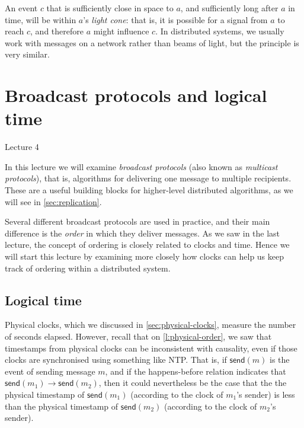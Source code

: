 An event $c$ that is sufficiently close in space to $a$, and sufficiently long after $a$ in time, will be within $a$'s \emph{light cone}: that is, it is possible for a signal from $a$ to reach $c$, and therefore $a$ might influence $c$.
In distributed systems, we usually work with messages on a network rather than beams of light, but the principle is very similar.



\section{Broadcast protocols and logical time}\label{sec:broadcast}

\begin{frame}
    \begin{center}
        Lecture 4\\[2em]
        \Large{\color{darkblue}{Broadcast protocols and logical time}}
    \end{center}
\end{frame}

In this lecture we will examine \emph{broadcast protocols} (also known as \emph{multicast protocols}), that is, algorithms for delivering one message to multiple recipients.
These are a useful building blocks for higher-level distributed algorithms, as we will see in \autoref{sec:replication}.

Several different broadcast protocols are used in practice, and their main difference is the \emph{order} in which they deliver messages.
As we saw in the last lecture, the concept of ordering is closely related to clocks and time.
Hence we will start this lecture by examining more closely how clocks can help us keep track of ordering within a distributed system.

\subsection{Logical time}\label{sec:logical-time}


Physical clocks, which we discussed in \autoref{sec:physical-clocks}, measure the number of seconds elapsed.
However, recall that on \autoref{l:physical-order}, we saw that timestamps from physical clocks can be inconsistent with causality, even if those clocks are synchronised using something like NTP.
That is, if $\mathsf{send}(m)$ is the event of sending message $m$, and if the happens-before relation indicates that $\mathsf{send}(m_1) \rightarrow \mathsf{send}(m_2)$, then it could nevertheless be the case that the the physical timestamp of $\mathsf{send}(m_1)$ (according to the clock of $m_1$'s sender) is less than the physical timestamp of $\mathsf{send}(m_2)$ (according to the clock of $m_2$'s sender).

